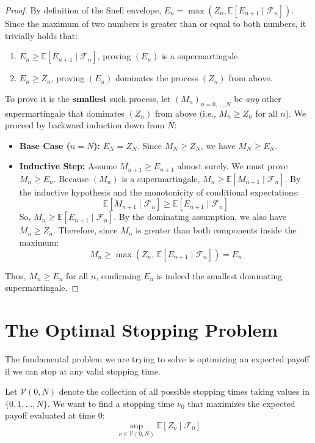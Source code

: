 \begin{proof}
By definition of the Snell envelope, $E_n = \max( Z_n, \mathbb{E}[ E_{n+1} \mid \mathcal{F}_n ] )$. 
Since the maximum of two numbers is greater than or equal to both numbers, it trivially holds that:
\begin{enumerate}
    \item $E_n \geq \mathbb{E}[ E_{n+1} \mid \mathcal{F}_n ]$, proving $(E_n)$ is a supermartingale.
    \item $E_n \geq Z_n$, proving $(E_n)$ dominates the process $(Z_n)$ from above.
\end{enumerate}

To prove it is the \textbf{smallest} such process, let $(M_n)_{n=0,\dots,N}$ be \textit{any} other supermartingale that dominates $(Z_n)$ from above (i.e., $M_n \geq Z_n$ for all $n$). We proceed by backward induction down from $N$:
\begin{itemize}
    \item \textbf{Base Case ($n = N$):} $E_N = Z_N$. Since $M_N \geq Z_N$, we have $M_N \geq E_N$.
    \item \textbf{Inductive Step:} Assume $M_{n+1} \geq E_{n+1}$ almost surely. We must prove $M_n \geq E_n$.
    Because $(M_n)$ is a supermartingale, $M_n \geq \mathbb{E}[ M_{n+1} \mid \mathcal{F}_n ]$. 
    By the inductive hypothesis and the monotonicity of conditional expectations:
    $$ \mathbb{E}[ M_{n+1} \mid \mathcal{F}_n ] \geq \mathbb{E}[ E_{n+1} \mid \mathcal{F}_n ] $$
    So, $M_n \geq \mathbb{E}[ E_{n+1} \mid \mathcal{F}_n ]$. 
    By the dominating assumption, we also have $M_n \geq Z_n$. 
    Therefore, since $M_n$ is greater than both components inside the maximum:
    $$ M_n \geq \max\left( Z_n, \, \mathbb{E}\left[ E_{n+1} \mid \mathcal{F}_n \right] \right) = E_n $$
\end{itemize}
Thus, $M_n \geq E_n$ for all $n$, confirming $E_n$ is indeed the smallest dominating supermartingale.
\end{proof}

\section{The Optimal Stopping Problem}

The fundamental problem we are trying to solve is optimizing an expected payoff if we can stop at any valid stopping time. 

Let $\mathcal{V}(0, N)$ denote the collection of all possible stopping times taking values in $\{0, 1, \ldots, N\}$. We want to find a stopping time $\nu_0$ that maximizes the expected payoff evaluated at time $0$:
$$ \sup_{\nu \in \mathcal{V}(0,N)} \mathbb{E}\left[ Z_\nu \mid \mathcal{F}_0 \right] $$

